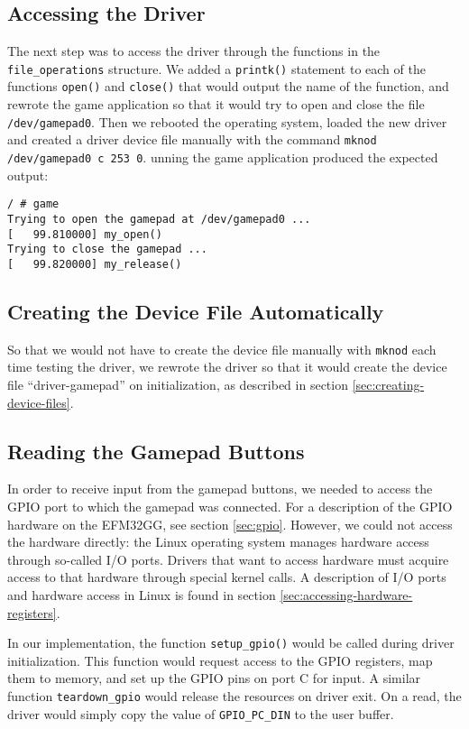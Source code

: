 \subsection{Accessing the Driver}
The next step was to access the driver through the functions in the \texttt{file\_operations} structure. We added a \texttt{printk()} statement to each of the functions \texttt{open()} and \texttt{close()} that would output the name of the function, and rewrote the game application so that it would try to open and close the file \texttt{/dev/gamepad0}. Then we rebooted the operating system, loaded the new driver and created a driver device file manually with the command \texttt{mknod /dev/gamepad0 c 253 0}. unning the game application produced the expected output:
\lstset{style=lststyle-terminal}
\begin{lstlisting}[caption=Accessing the driver,label=lst:accessing-the-driver]
/ # game
Trying to open the gamepad at /dev/gamepad0 ...
[   99.810000] my_open()
Trying to close the gamepad ...
[   99.820000] my_release()
\end{lstlisting}

\subsection{Creating the Device File Automatically}
So that we would not have to create the device file manually with \texttt{mknod} each time testing the driver, we rewrote the driver so that it would create the device file ``driver-gamepad'' on initialization, as described in section \ref{sec:creating-device-files}.

\subsection{Reading the Gamepad Buttons}
In order to receive input from the gamepad buttons, we needed to access the GPIO port to which the gamepad was connected. For a description of the GPIO hardware on the EFM32GG, see section \ref{sec:gpio}. However, we could not access the hardware directly: the Linux operating system manages hardware access through so-called I/O ports. Drivers that want to access hardware must acquire access to that hardware through special kernel calls. A description of I/O ports and hardware access in Linux is found in section \ref{sec:accessing-hardware-registers}.

In our implementation, the function \texttt{setup\_gpio()} would be called during driver initialization. This function would request access to the GPIO registers, map them to memory, and set up the GPIO pins on port C for input. A similar function \texttt{teardown\_gpio} would release the resources on driver exit. On a read, the driver would simply copy the value of \texttt{GPIO\_PC\_DIN} to the user buffer.

